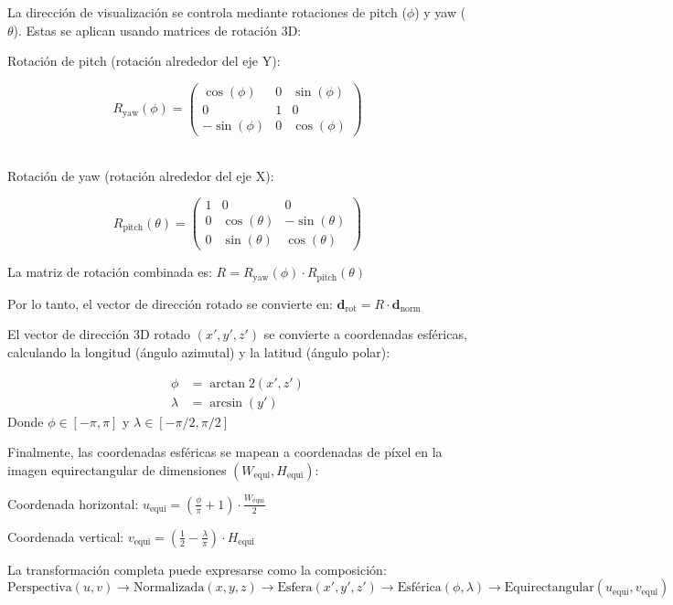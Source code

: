 La dirección de visualización se controla mediante rotaciones de pitch ($\phi$) y yaw ($\theta$). Estas se aplican usando matrices de rotación 3D:

Rotación de pitch (rotación alrededor del eje Y):

$$R_{\text{yaw}}(\phi) = \begin{pmatrix}
\cos(\phi) & 0 & \sin(\phi) \\
0 & 1 & 0 \\
-\sin(\phi) & 0 & \cos(\phi)
\end{pmatrix}$$

\\
Rotación de yaw (rotación alrededor del eje X):

$$R_{\text{pitch}}(\theta) = \begin{pmatrix}
1 & 0 & 0 \\
0 & \cos(\theta) & -\sin(\theta) \\
0 & \sin(\theta) & \cos(\theta)
\end{pmatrix}$$

La matriz de rotación combinada es:
$R = R_{\text{yaw}}(\phi) \cdot R_{\text{pitch}}(\theta)$

Por lo tanto, el vector de dirección rotado se convierte en:
$\mathbf{d}_{\text{rot}} = R \cdot \mathbf{d}_{\text{norm}}$


El vector de dirección 3D rotado $(x', y', z')$ se convierte a coordenadas esféricas, calculando la longitud (ángulo azimutal) y la latitud (ángulo polar):


$$
\begin{align}
\phi &= \arctan2(x', z')\\
\lambda &= \arcsin(y')
\end{align}
$$
Donde $\phi \in [-\pi, \pi]$ y $\lambda \in [-\pi/2, \pi/2]$

Finalmente, las coordenadas esféricas se mapean a coordenadas de píxel en la imagen equirectangular de dimensiones $(W_{\text{equi}}, H_{\text{equi}})$:

Coordenada horizontal:
$u_{\text{equi}} = \left(\frac{\phi}{\pi} + 1\right) \cdot \frac{W_{\text{equi}}}{2}$

Coordenada vertical:
$v_{\text{equi}} = \left(\frac{1}{2} - \frac{\lambda}{\pi}\right) \cdot H_{\text{equi}}$

La transformación completa puede expresarse como la composición:
$\text{Perspectiva}(u,v) \rightarrow \text{Normalizada}(x,y,z) \rightarrow \text{Esfera}(x',y',z') \rightarrow \text{Esférica}(\phi,\lambda) \rightarrow \text{Equirectangular}(u_{\text{equi}},v_{\text{equi}})$


